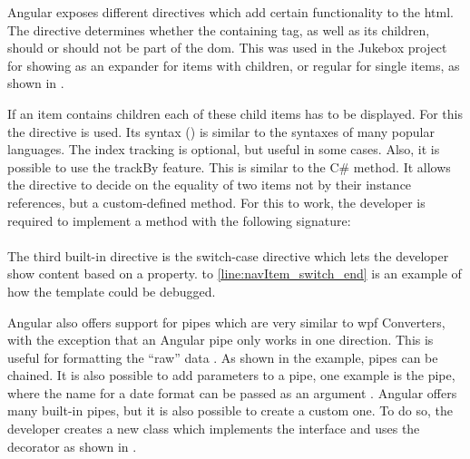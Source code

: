 
Angular exposes different directives which add certain functionality to the \gls{html}. The  directive determines whether the containing tag, as well as its children, should or should not be part of the \gls{dom}. This was used in the Jukebox project for showing  as an expander for items with children, or regular for single items, as shown in .

If an item contains children each of these child items has to be displayed. For this the  directive is used. Its syntax () is similar to the  syntaxes of many popular languages. The index tracking is optional, but useful in some cases. Also, it is possible to use the trackBy feature. This is similar to the  C\# method. It allows the  directive to decide on the equality of two items not by their instance references, but a custom-defined method. For this to work, the developer is required to implement a method with the following signature:\\
\\

The third built-in directive is the switch-case directive which lets the developer show content based on a property.  to \ref{line:navItem_switch_end} is an example of how the  template could be debugged.


Angular also offers support for pipes which are very similar to \gls{wpf} Converters, with the exception that an Angular pipe only works in one direction. This is useful for formatting the \enquote{raw} data \zB {}. As shown in the example, pipes can be chained. It is also possible to add parameters to a pipe, one example is the  pipe, where the name for a date format can be passed as an argument \zB {}. Angular offers many built-in pipes, but it is also possible to create a custom one. To do so, the developer creates a new class which implements the  interface and uses the  decorator as shown in .

